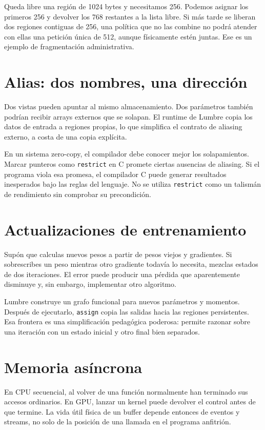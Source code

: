 \documentclass[12pt,a4paper,oneside]{report}
\begin{document}
\begin{ejemplo}
Queda libre una región de 1024 bytes y necesitamos 256. Podemos asignar los primeros 256 y devolver los 768 restantes a la lista libre. Si más tarde se liberan dos regiones contiguas de 256, una política que no las combine no podrá atender con ellas una petición única de 512, aunque físicamente estén juntas. Ese es un ejemplo de fragmentación administrativa.

\end{ejemplo}
\section{Alias: dos nombres, una dirección}
Dos vistas pueden apuntar al mismo almacenamiento. Dos parámetros también podrían recibir arrays externos que se solapan. El runtime de Lumbre copia los datos de entrada a regiones propias, lo que simplifica el contrato de aliasing externo, a costa de una copia explícita.

En un sistema zero-copy, el compilador debe conocer mejor los solapamientos. Marcar punteros como \texttt{restrict} en C promete ciertas ausencias de aliasing. Si el programa viola esa promesa, el compilador C puede generar resultados inesperados bajo las reglas del lenguaje. No se utiliza \texttt{restrict} como un talismán de rendimiento sin comprobar su precondición.

\section{Actualizaciones de entrenamiento}
Supón que calculas nuevos pesos a partir de pesos viejos y gradientes. Si sobrescribes un peso mientras otro gradiente todavía lo necesita, mezclas estados de dos iteraciones. El error puede producir una pérdida que aparentemente disminuye y, sin embargo, implementar otro algoritmo.

Lumbre construye un grafo funcional para nuevos parámetros y momentos. Después de ejecutarlo, \texttt{assign} copia las salidas hacia las regiones persistentes. Esa frontera es una simplificación pedagógica poderosa: permite razonar sobre una iteración con un estado inicial y otro final bien separados.

\section{Memoria asíncrona}
En CPU secuencial, al volver de una función normalmente han terminado sus accesos ordinarios. En GPU, lanzar un kernel puede devolver el control antes de que termine. La vida útil física de un buffer depende entonces de eventos y streams, no solo de la posición de una llamada en el programa anfitrión.
\end{document}
